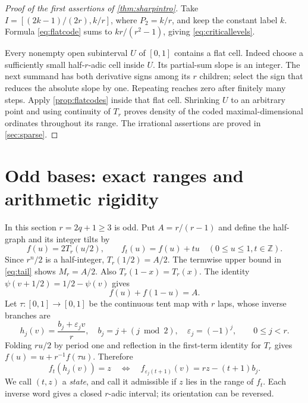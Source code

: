 \documentclass[11pt]{article}
\theoremstyle{definition}
\theoremstyle{remark}
\newcommand{\Z}{\mathbb Z}
\begin{document}
\begin{proof}[Proof of the first assertions of \cref{thm:sharpintro}]
Take $I=[(2k-1)/(2r),k/r]$, where $P_2=k/r$, and keep the constant label
$k$. Formula \cref{eq:flatcode} sums to $kr/(r^2-1)$, giving
\cref{eq:criticallevels}.

Every nonempty open subinterval $U$ of $[0,1]$ contains a flat cell.
Indeed choose a sufficiently small half-$r$-adic cell inside $U$.
Its partial-sum slope is an integer. The next summand has both derivative
signs among its $r$ children; select the sign that reduces the absolute
slope by one. Repeating reaches zero after finitely many steps.
Apply \cref{prop:flatcodes} inside that flat cell. Shrinking $U$ to an
arbitrary point and using continuity of $T_r$ proves density of the coded
maximal-dimensional ordinates throughout its range.
The irrational assertions are proved in \cref{sec:sparse}.
\end{proof}

\section{Odd bases: exact ranges and arithmetic rigidity}\label{sec:odd}
In this section $r=2q+1\ge3$ is odd. Put $A=r/(r-1)$ and define the
half-graph and its integer tilts by
\[
 f(u)=2T_r(u/2),\qquad f_t(u)=f(u)+tu\quad(0\le u\le1, t\in\Z).
\]
Since $r^n/2$ is a half-integer, $T_r(1/2)=A/2$. The termwise upper bound
in \cref{eq:tail} shows $M_r=A/2$. Also
$T_r(1-x)=T_r(x)$. The identity
$\psi(v+1/2)=1/2-\psi(v)$ gives
\begin{equation}\label{eq:antisymmetry}
 f(u)+f(1-u)=A.
\end{equation}
Let $\tau:[0,1]\to[0,1]$ be the continuous tent map with $r$ laps,
whose inverse branches are
\begin{equation}\label{eq:branches}
 h_j(v)=\frac{b_j+\varepsilon_jv}{r},\quad
 b_j=j+(j\bmod2),\quad \varepsilon_j=(-1)^j,
 \qquad0\le j<r.
\end{equation}
Folding $ru/2$ by period one and reflection in the first-term identity
for $T_r$ gives $f(u)=u+r^{-1}f(\tau u)$. Therefore
\begin{equation}\label{eq:states}
 f_t(h_j(v))=z
 \quad\Longleftrightarrow\quad
 f_{\varepsilon_j(t+1)}(v)=rz-(t+1)b_j.
\end{equation}
We call $(t,z)$ a \emph{state}, and call it admissible if $z$ lies in
the range of $f_t$. Each inverse word gives a closed $r$-adic interval;
its orientation can be reversed.
\end{document}
